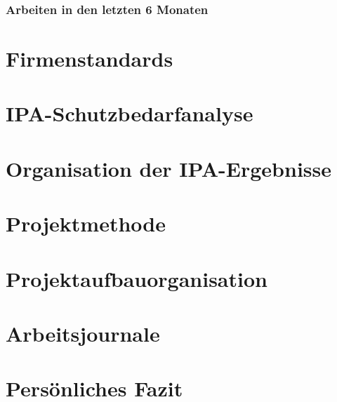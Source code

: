 \subsection{Arbeiten in den letzten 6 Monaten}

\chapter{Firmenstandards}

\chapter{IPA-Schutzbedarfanalyse}

\chapter{Organisation der IPA-Ergebnisse}

\chapter{Projektmethode}

\chapter{Projektaufbauorganisation}



\chapter{Arbeitsjournale}











\chapter{Persönliches Fazit}